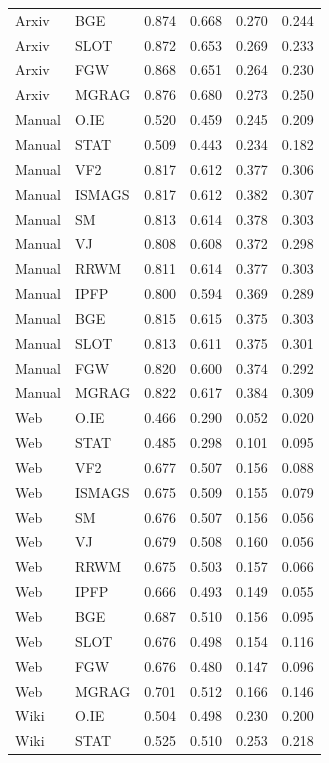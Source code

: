 {\begin{longtable}{llrrrr}
Arxiv & BGE & 0.874 & 0.668 & 0.270 & 0.244 \\
Arxiv & SLOT & 0.872 & 0.653 & 0.269 & 0.233 \\
Arxiv & FGW & 0.868 & 0.651 & 0.264 & 0.230 \\
Arxiv & MGRAG & 0.876 & 0.680 & 0.273 & 0.250 \\
\midrule
Manual & O.IE & 0.520 & 0.459 & 0.245 & 0.209 \\
Manual & STAT & 0.509 & 0.443 & 0.234 & 0.182 \\
Manual & VF2 & 0.817 & 0.612 & 0.377 & 0.306 \\
Manual & ISMAGS & 0.817 & 0.612 & 0.382 & 0.307 \\
Manual & SM & 0.813 & 0.614 & 0.378 & 0.303 \\
Manual & VJ & 0.808 & 0.608 & 0.372 & 0.298 \\
Manual & RRWM & 0.811 & 0.614 & 0.377 & 0.303 \\
Manual & IPFP & 0.800 & 0.594 & 0.369 & 0.289 \\
Manual & BGE & 0.815 & 0.615 & 0.375 & 0.303 \\
Manual & SLOT & 0.813 & 0.611 & 0.375 & 0.301 \\
Manual & FGW & 0.820 & 0.600 & 0.374 & 0.292 \\
Manual & MGRAG & 0.822 & 0.617 & 0.384 & 0.309 \\
\midrule
Web & O.IE & 0.466 & 0.290 & 0.052 & 0.020 \\
Web & STAT & 0.485 & 0.298 & 0.101 & 0.095 \\
Web & VF2 & 0.677 & 0.507 & 0.156 & 0.088 \\
Web & ISMAGS & 0.675 & 0.509 & 0.155 & 0.079 \\
Web & SM & 0.676 & 0.507 & 0.156 & 0.056 \\
Web & VJ & 0.679 & 0.508 & 0.160 & 0.056 \\
Web & RRWM & 0.675 & 0.503 & 0.157 & 0.066 \\
Web & IPFP & 0.666 & 0.493 & 0.149 & 0.055 \\
Web & BGE & 0.687 & 0.510 & 0.156 & 0.095 \\
Web & SLOT & 0.676 & 0.498 & 0.154 & 0.116 \\
Web & FGW & 0.676 & 0.480 & 0.147 & 0.096 \\
Web & MGRAG & 0.701 & 0.512 & 0.166 & 0.146 \\
\midrule
Wiki & O.IE & 0.504 & 0.498 & 0.230 & 0.200 \\
Wiki & STAT & 0.525 & 0.510 & 0.253 & 0.218 \\

\end{longtable}}
